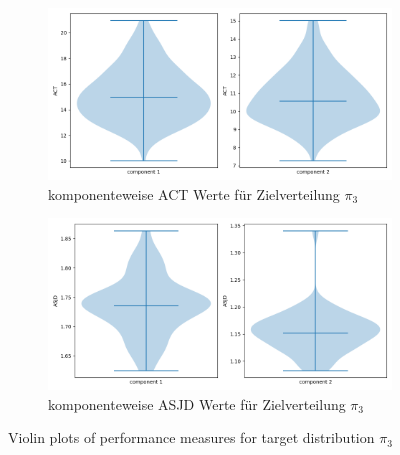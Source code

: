 \documentclass{scrartcl}
\begin{document}
    \begin{figure}
        \centering
        \begin{subfigure}{0.45\textheight}
              \centering
              \includegraphics[width=.8\linewidth]{../figs/ACT_pi_3.png}
              \caption{komponenteweise ACT Werte für Zielverteilung $\pi_3$}
              \label{violin_plots_pi_3_act}
        \end{subfigure}
        \begin{subfigure}{0.45\textheight}
              \centering
              \includegraphics[width=.8\linewidth]{../figs/ASJD_pi_3.png}
              \caption{komponenteweise ASJD Werte für Zielverteilung $\pi_3$}
              \label{violin_plots_pi_3_asjd}
        \end{subfigure}
        \caption{Violin plots of performance measures for target distribution $\pi_3$}
        \label{violin_plots_pi_3}
    \end{figure}
\end{document}
